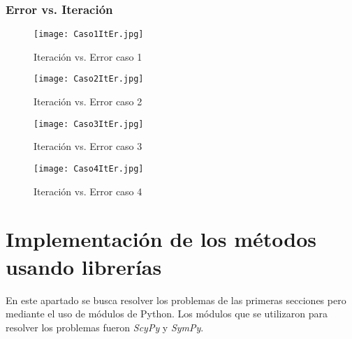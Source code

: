 \documentclass{article}
\begin{document}
\subsubsection{Error vs. Iteración}
\begin{figure}[H]
    \centering
    \texttt{[image: Caso1ItEr.jpg]}
    \caption{Iteración vs. Error caso 1}
    \label{fig:TablaRFC1}
\end{figure}
\begin{figure}[H]
    \centering
    \texttt{[image: Caso2ItEr.jpg]}
    \caption{Iteración vs. Error caso 2}
    \label{fig:TablaRFC2}
\end{figure}
\begin{figure}[H]
    \centering
    \texttt{[image: Caso3ItEr.jpg]}
    \caption{Iteración vs. Error caso 3}
    \label{fig:TablaRFC3}
\end{figure}
\begin{figure}[H]
    \centering
    \texttt{[image: Caso4ItEr.jpg]}
    \caption{Iteración vs. Error caso 4}
    \label{fig:TablaRFC4}
\end{figure}

\section{Implementación de los métodos usando librerías }
En este apartado se busca resolver los problemas de las primeras secciones pero mediante el uso de módulos de Python. Los módulos que se utilizaron para resolver los problemas fueron \emph{ScyPy} y \emph{SymPy}.
\end{document}
